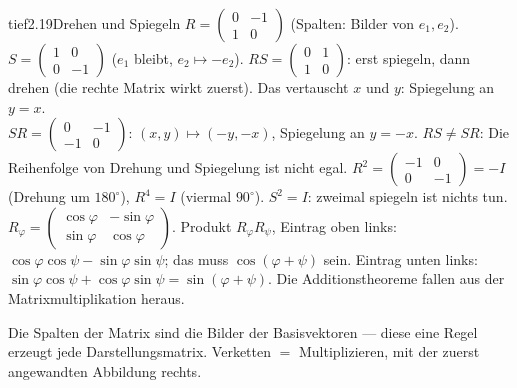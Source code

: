 \begin{loesungkarte}{tief}{2.19}{Drehen und Spiegeln}
$R = \begin{pmatrix}0 & -1\\ 1 & 0\end{pmatrix}$ (Spalten: Bilder von $e_1, e_2$). $S = \begin{pmatrix}1 & 0\\ 0 & -1\end{pmatrix}$ ($e_1$ bleibt, $e_2\mapsto-e_2$).
$RS = \begin{pmatrix}0 & 1\\ 1 & 0\end{pmatrix}$: erst spiegeln, dann drehen (die rechte Matrix wirkt zuerst). Das vertauscht $x$ und $y$: Spiegelung an $y = x$. \\
$SR = \begin{pmatrix}0 & -1\\ -1 & 0\end{pmatrix}$: $(x, y)\mapsto(-y, -x)$, Spiegelung an $y = -x$. $RS\neq SR$: Die Reihenfolge von Drehung und Spiegelung ist nicht egal.
$R^{2} = \begin{pmatrix}-1 & 0\\ 0 & -1\end{pmatrix} = -I$ (Drehung um $180^{\circ}$), $R^{4} = I$ (viermal $90^{\circ}$). $S^{2} = I$: zweimal spiegeln ist nichts tun.
$R_\varphi = \begin{pmatrix}\cos\varphi & -\sin\varphi\\ \sin\varphi & \cos\varphi\end{pmatrix}$. Produkt $R_\varphi R_\psi$, Eintrag oben links: $\cos\varphi\cos\psi - \sin\varphi\sin\psi$; das muss $\cos(\varphi + \psi)$ sein. Eintrag unten links: $\sin\varphi\cos\psi + \cos\varphi\sin\psi = \sin(\varphi + \psi)$. Die Additionstheoreme fallen aus der Matrixmultiplikation heraus.
\begin{mitnehmen}\kastentext
Die Spalten der Matrix sind die Bilder der Basisvektoren --- diese eine Regel erzeugt jede Darstellungsmatrix. Verketten $=$ Multiplizieren, mit der zuerst angewandten Abbildung rechts.
\end{mitnehmen}
\end{loesungkarte}


